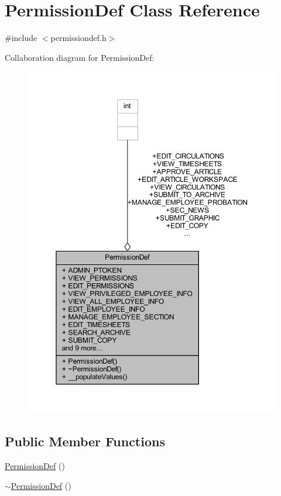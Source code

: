 \hypertarget{class_permission_def}{}\section{Permission\+Def Class Reference}
\label{class_permission_def}


{\ttfamily \#include $<$permissiondef.\+h$>$}



Collaboration diagram for Permission\+Def\+:
\nopagebreak
\begin{figure}[H]
\begin{center}
\leavevmode
\includegraphics[width=350pt]{class_permission_def__coll__graph}
\end{center}
\end{figure}
\subsection*{Public Member Functions}
\begin{DoxyCompactItemize}
\item 
\hyperlink{class_permission_def_adb411b1363f1056e3247c1d16af4ac0d}{Permission\+Def} ()
\item 
\hyperlink{class_permission_def_a2f0107567674d913f9a9d4a0a93026ea}{$\sim$\+Permission\+Def} ()
\end{DoxyCompactItemize}
